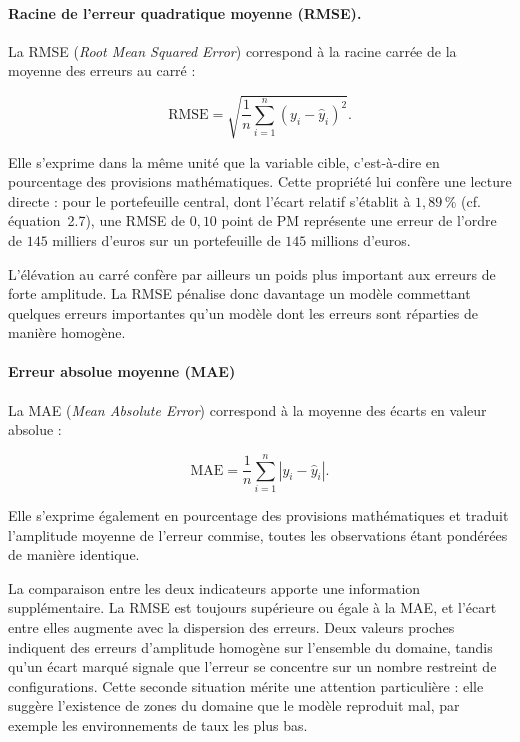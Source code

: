 \paragraph{Racine de l'erreur quadratique moyenne (RMSE).}
La RMSE (\textit{Root Mean Squared Error}) correspond à la racine carrée de la moyenne des 
erreurs au carré :

\begin{equation}
\text{RMSE} = \sqrt{\frac{1}{n} \sum_{i=1}^{n} \left( y_i - \hat{y}_i \right)^2}.
\label{eq:rmse}
\end{equation}

Elle s'exprime dans la même unité que la variable cible, c'est-à-dire en pourcentage des 
provisions mathématiques. Cette propriété lui confère une lecture directe : pour le 
portefeuille central, dont l'écart relatif s'établit à $1{,}89\,\%$ (cf. équation~2.7), une 
RMSE de $0{,}10$ point de PM représente une erreur de l'ordre de $145$ milliers d'euros sur 
un portefeuille de $145$ millions d'euros.

L'élévation au carré confère par ailleurs un poids plus important aux erreurs de forte 
amplitude. La RMSE pénalise donc davantage un modèle commettant quelques erreurs 
importantes qu'un modèle dont les erreurs sont réparties de manière homogène.

\paragraph{Erreur absolue moyenne (MAE)}
La MAE (\textit{Mean Absolute Error}) correspond à la moyenne des écarts en valeur absolue :

\begin{equation}
\text{MAE} = \frac{1}{n} \sum_{i=1}^{n} \left| y_i - \hat{y}_i \right|.
\label{eq:mae}
\end{equation}

Elle s'exprime également en pourcentage des provisions mathématiques et traduit l'amplitude 
moyenne de l'erreur commise, toutes les observations étant pondérées de manière identique.

La comparaison entre les deux indicateurs apporte une information supplémentaire. La RMSE 
est toujours supérieure ou égale à la MAE, et l'écart entre elles augmente avec la 
dispersion des erreurs. Deux valeurs proches indiquent des erreurs d'amplitude homogène sur 
l'ensemble du domaine, tandis qu'un écart marqué signale que l'erreur se concentre sur un 
nombre restreint de configurations. Cette seconde situation mérite une attention 
particulière : elle suggère l'existence de zones du domaine que le modèle reproduit mal, 
par exemple les environnements de taux les plus bas.

